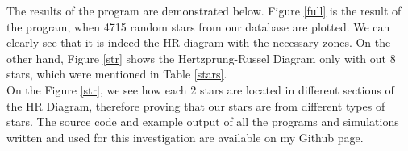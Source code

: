 \documentclass{article}
\begin{document}
  The results of the program are demonstrated below. Figure \ref{full} is the result of the program, when 4715 random stars from our database are plotted. We can clearly see that it is indeed the HR diagram with the necessary zones. On the other hand, Figure \ref{str} shows the Hertzprung-Russel Diagram only with out 8 stars, which were mentioned in Table \ref{stars}.\\

  On the Figure \ref{str}, we see how each 2 stars are located in different sections of the HR Diagram, therefore proving that our stars are from different types of stars. The source code and example output of all the programs and simulations written and used for this investigation are available on my Github page.\cite{github}\\
  
\end{document}
